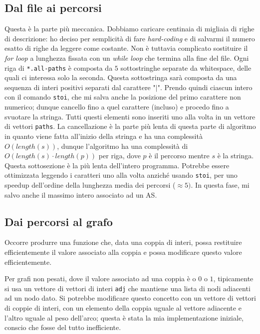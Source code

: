 \documentclass[a4paper]{article}
\begin{document}
\subsection{Dal file ai percorsi}
Questa è la parte più meccanica. Dobbiamo caricare centinaia di migliaia di righe di descrizione: ho deciso per semplicità di fare \textit{hard-coding} e di salvarmi il numero esatto di righe da leggere come costante. Non è tuttavia complicato sostituire il \textit{for loop} a lunghezza fissata con un \textit{while loop} che termina alla fine del file. Ogni riga di \texttt{*.all-paths} è composta da $5$ sottostringhe separate da whitespace, delle quali ci interessa solo la seconda. Questa sottostringa sarà composta da una sequenza di interi positivi separati dal carattere "$\mid$". Prendo quindi ciascun intero con il comando \texttt{stoi}, che mi salva anche la posizione del primo carattere non numerico; dunque cancello fino a quel carattere (incluso) e procedo fino a svuotare la stringa. Tutti questi elementi sono inseriti uno alla volta in un vettore di vettori \texttt{paths}. La cancellazione è la parte più lenta di questa parte di algoritmo in quanto viene fatta all'inizio della stringa e ha una complessità $O(length(s))$, dunque l'algoritmo ha una complessità di $O(length(s)\cdot length(p))$ per riga, dove $p$ è il percorso mentre $s$ è la stringa. Questa sottosezione è la più lenta dell'intero programma. Potrebbe essere ottimizzata leggendo i caratteri uno alla volta anziché usando \texttt{stoi}, per uno speedup dell'ordine della lunghezza media dei percorsi ($\approx5)$. In questa fase, mi salvo anche il massimo intero associato ad un AS.

\subsection{Dai percorsi al grafo}
Occorre produrre una funzione che, data una coppia di interi, possa restituire efficientemente il valore associato alla coppia e possa modificare questo valore efficientemente. 

Per grafi non pesati, dove il valore associato ad una coppia è o $0$ o $1$, tipicamente si usa un vettore di vettori di interi \texttt{adj} che mantiene una lista di nodi adiacenti ad un nodo dato. Si potrebbe modificare questo concetto con un vettore di vettori di coppie di interi, con un elemento della coppia uguale al vettore adiacente e l'altro uguale al peso dell'arco; questa è stata la mia implementazione iniziale, conscio che fosse del tutto inefficiente.
\end{document}
